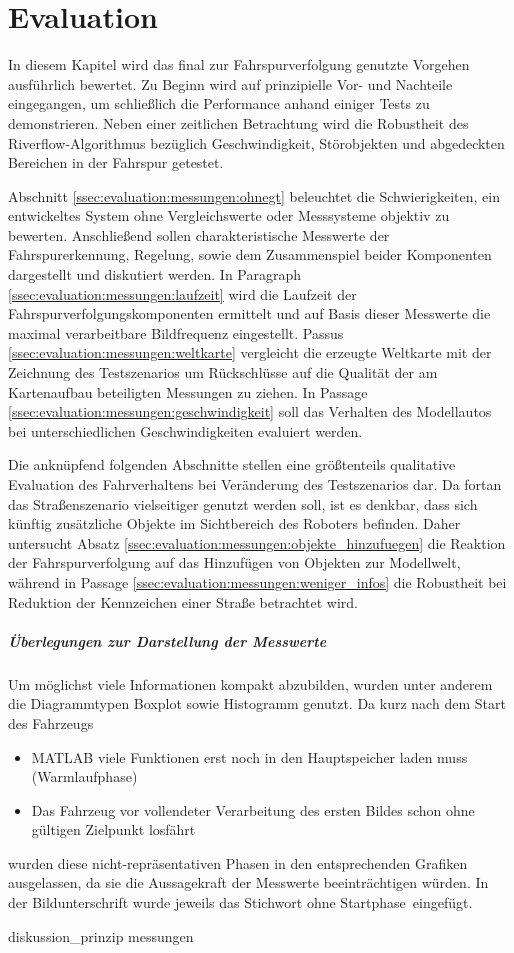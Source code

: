 \chapter{Evaluation \dcfirstauthorshort}
\label{cha:evaluation}

In diesem Kapitel wird das final zur Fahrspurverfolgung genutzte Vorgehen ausführlich bewertet. Zu Beginn wird auf prinzipielle Vor- und Nachteile eingegangen, um schließlich die Performance anhand einiger Tests zu demonstrieren. Neben einer zeitlichen Betrachtung wird die Robustheit des Riverflow-Algorithmus bezüglich Geschwindigkeit, Störobjekten und abgedeckten Bereichen in der Fahrspur getestet.

Abschnitt \ref{ssec:evaluation:messungen:ohnegt} beleuchtet die Schwierigkeiten, ein entwickeltes System ohne Vergleichswerte oder Messsysteme objektiv zu bewerten. Anschließend sollen charakteristische Messwerte der Fahrspurerkennung, Regelung, sowie dem Zusammenspiel beider Komponenten dargestellt und diskutiert werden. In Paragraph \ref{ssec:evaluation:messungen:laufzeit} wird die Laufzeit der Fahrspurverfolgungskomponenten ermittelt und auf Basis dieser Messwerte die maximal verarbeitbare Bildfrequenz eingestellt. Passus \ref{ssec:evaluation:messungen:weltkarte} vergleicht die erzeugte Weltkarte mit der Zeichnung des Testszenarios um Rückschlüsse auf die Qualität der am Kartenaufbau beteiligten Messungen zu ziehen. In Passage \ref{ssec:evaluation:messungen:geschwindigkeit} soll das Verhalten des Modellautos bei unterschiedlichen Geschwindigkeiten evaluiert werden. 

Die anknüpfend folgenden Abschnitte stellen eine größtenteils qualitative Evaluation des Fahrverhaltens bei Veränderung des Testszenarios dar. Da fortan das Straßenszenario vielseitiger genutzt werden soll, ist es denkbar, dass sich künftig zusätzliche Objekte im Sichtbereich des Roboters befinden. Daher untersucht Absatz \ref{ssec:evaluation:messungen:objekte_hinzufuegen} die Reaktion der Fahrspurverfolgung auf das Hinzufügen von Objekten zur Modellwelt, während in Passage \ref{ssec:evaluation:messungen:weniger_infos} die Robustheit bei Reduktion der Kennzeichen einer Straße betrachtet wird.

\paragraph{Überlegungen zur Darstellung der Messwerte  \dcsecondauthorshort}
Um möglichst viele Informationen kompakt abzubilden, wurden unter anderem die Diagrammtypen Boxplot sowie Histogramm genutzt. Da kurz nach dem Start des Fahrzeugs 
\begin{itemize}
	\item
	MATLAB viele Funktionen erst noch in den Hauptspeicher laden muss (\glqq Warmlaufphase\grqq)
	\item
	Das Fahrzeug vor vollendeter Verarbeitung des ersten Bildes schon ohne gültigen Zielpunkt losfährt
\end{itemize}
wurden diese nicht-repräsentativen Phasen in den entsprechenden Grafiken ausgelassen, da sie die Aussagekraft der Messwerte beeinträchtigen würden. In der Bildunterschrift wurde jeweils das Stichwort \glqq ohne Startphase\grqq\ eingefügt.

{diskussion_prinzip}
{messungen}


